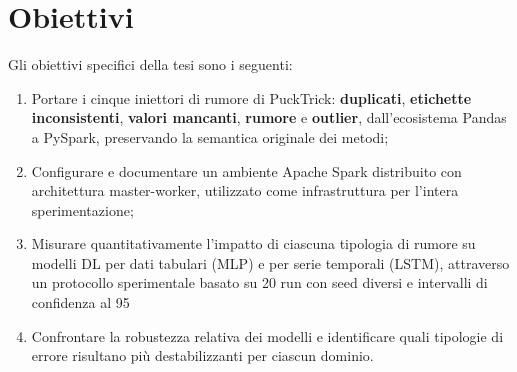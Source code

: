 \documentclass[../main.tex]{subfiles}
\begin{document}

\newpage

\section{Obiettivi}
Gli obiettivi specifici della tesi sono i seguenti:
\begin{enumerate}
\item Portare i cinque iniettori di rumore di PuckTrick: \textbf{duplicati}, \textbf{etichette inconsistenti}, \textbf{valori mancanti}, \textbf{rumore} e \textbf{outlier}, dall'ecosistema Pandas a PySpark, preservando la semantica originale dei metodi;
\item Configurare e documentare un ambiente Apache Spark distribuito con architettura master-worker, utilizzato come infrastruttura per l'intera sperimentazione;
\item Misurare quantitativamente l'impatto di ciascuna tipologia di rumore su modelli DL per dati tabulari (MLP) e per serie temporali (LSTM), attraverso un protocollo sperimentale basato su 20 run con seed diversi e intervalli di confidenza al 95%
\item Confrontare la robustezza relativa dei modelli e identificare quali tipologie di errore risultano più destabilizzanti per ciascun dominio.
\end{enumerate}
\end{document}
